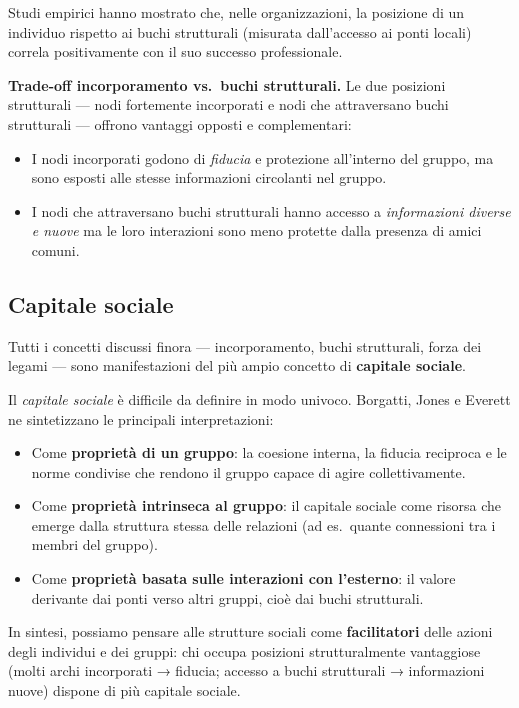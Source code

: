 \documentclass[12pt,a4paper]{article}
\begin{document}
Studi empirici hanno mostrato che, nelle organizzazioni, la posizione di un individuo
rispetto ai buchi strutturali (misurata dall'accesso ai ponti locali) correla
positivamente con il suo successo professionale.

\textbf{Trade-off incorporamento vs.\ buchi strutturali.}
Le due posizioni strutturali — nodi fortemente incorporati e nodi che attraversano
buchi strutturali — offrono vantaggi opposti e complementari:
\begin{itemize}
  \item I nodi incorporati godono di \emph{fiducia} e protezione all'interno del
        gruppo, ma sono esposti alle stesse informazioni circolanti nel gruppo.
  \item I nodi che attraversano buchi strutturali hanno accesso a \emph{informazioni
        diverse e nuove} ma le loro interazioni sono meno protette dalla presenza di
        amici comuni.
\end{itemize}

\subsection{Capitale sociale}

Tutti i concetti discussi finora — incorporamento, buchi strutturali, forza dei legami —
sono manifestazioni del più ampio concetto di \textbf{capitale sociale}.

Il \emph{capitale sociale} è difficile da definire in modo univoco. Borgatti, Jones e
Everett ne sintetizzano le principali interpretazioni:
\begin{itemize}
  \item Come \textbf{proprietà di un gruppo}: la coesione interna, la fiducia reciproca
        e le norme condivise che rendono il gruppo capace di agire collettivamente.
  \item Come \textbf{proprietà intrinseca al gruppo}: il capitale sociale come risorsa
        che emerge dalla struttura stessa delle relazioni (ad es.\ quante connessioni
        tra i membri del gruppo).
  \item Come \textbf{proprietà basata sulle interazioni con l'esterno}: il valore
        derivante dai ponti verso altri gruppi, cioè dai buchi strutturali.
\end{itemize}

In sintesi, possiamo pensare alle strutture sociali come \textbf{facilitatori} delle
azioni degli individui e dei gruppi: chi occupa posizioni strutturalmente vantaggiose
(molti archi incorporati → fiducia; accesso a buchi strutturali → informazioni nuove)
dispone di più capitale sociale.
\end{document}
